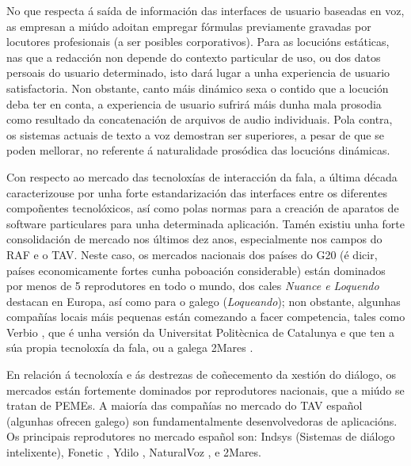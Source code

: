 \begin{multicols}{2}
No que respecta á saída de información das interfaces de usuario baseadas en voz, as empresan a miúdo adoitan empregar fórmulas previamente gravadas por locutores profesionais (a ser posibles corporativos). Para as locucións estáticas, nas que a redacción non depende do contexto particular de uso, ou dos datos persoais do usuario determinado, isto dará lugar a unha experiencia de usuario satisfactoria. Non obstante, canto máis dinámico sexa o contido que a locución deba ter en conta, a experiencia de usuario sufrirá máis dunha mala prosodia como resultado da concatenación de arquivos de audio individuais. Pola contra, os sistemas actuais de texto a voz demostran ser superiores, a pesar de que se poden mellorar, no referente á naturalidade prosódica das locucións dinámicas. 

Con respecto ao mercado das tecnoloxías de interacción da fala, a última década caracterizouse por unha forte estandarización das interfaces entre os diferentes compoñentes tecnolóxicos, así como polas normas para a creación de aparatos de software particulares para unha determinada aplicación. Tamén existiu unha forte consolidación de mercado nos últimos dez anos, especialmente nos campos do RAF e o TAV. Neste caso, os mercados nacionais dos países do G20 (é dicir, países economicamente fortes cunha poboación considerable) están dominados por menos de 5 reprodutores en todo o mundo, dos cales \textit{Nuance e Loquendo} destacan en Europa, así como para o galego (\textit{Loqueando}); non obstante, algunhas compañías locais máis pequenas están comezando a facer competencia, tales como Verbio \cite{GAL-Nota25} , que é unha versión da Universitat Politècnica de Catalunya e que ten a súa propia tecnoloxía da fala, ou a galega 2Mares \cite{GAL-Nota26}.

En relación á tecnoloxía e ás destrezas de coñecemento da xestión do diálogo, os mercados están fortemente dominados por reprodutores nacionais, que a miúdo se tratan de PEMEs.
A maioría das compañías no mercado do TAV español (algunhas ofrecen galego) son fundamentalmente desenvolvedoras de aplicacións. Os principais reprodutores no mercado español son: Indsys \cite{GAL-Nota27} (Sistemas de diálogo intelixente), Fonetic \cite{GAL-Nota28}, Ydilo \cite{GAL-Nota29}, NaturalVoz \cite{GAL-Nota30}, e 2Mares.


\end{multicols}
